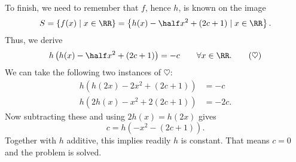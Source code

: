 \documentclass[11pt]{scrartcl}
\begin{document}
To finish, we need to remember that $f$, hence $h$, is known
on the image
\[ S =  \left\{ f(x) \mid x \in \RR \right\}
  = \left\{ h(x) - \half x^2 + (2c+1) \mid x \in \RR \right\}. \]
Thus, we derive
\[ h\left( h(x)-\half x^2+(2c+1) \right) = -c
  \qquad \forall x \in \RR. \qquad(\heartsuit)  \]
We can take the following two instances of $\heartsuit$:
\begin{align*}
  h\left( h(2x)-2x^2+(2c+1) \right) &= -c \\
  h\left( 2h(x)-x^2+2(2c+1) \right) &= -2c.
\end{align*}
Now subtracting these and using $2h(x)=h(2x)$ gives
\[ c = h\left( -x^2 - (2c+1) \right). \]
Together with $h$ additive, this implies readily $h$ is constant.
That means $c=0$ and the problem is solved.
\pagebreak
\end{document}
